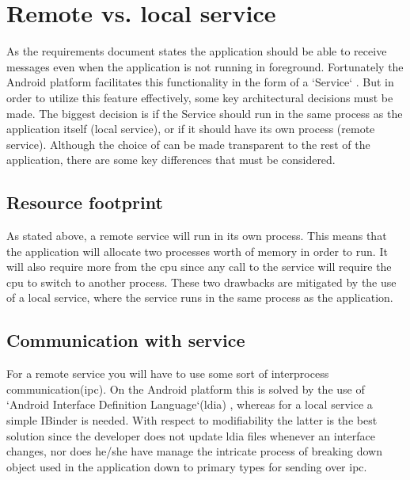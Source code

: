 

\section{Remote vs. local service}

As the requirements document states the application should be able to receive messages even when the application is not running in foreground. Fortunately the Android platform facilitates this functionality in the form of a `Service` \cite{bib:service}. But in order to utilize this feature effectively, some key architectural decisions must be made. The biggest decision is if the Service should run in the same process as the application itself (local service), or if it should have its own process (remote service). Although the choice of can be made transparent to the rest of the application, there are some key differences that must be considered.

\subsection{Resource footprint}
As stated above, a remote service will run in its own process. This means that the application will allocate two processes worth of memory in order to run. It will also require more from the \gls{cpu} since any call to the service will require the \gls{cpu} to switch to another process. These two drawbacks are mitigated by the use of a local service, where the service runs in the same process as the application. 

\subsection{Communication with service}
For a remote service you will have to use some sort of  interprocess communication(\gls{ipc}). On the Android platform this is solved by the use of `Android Interface Definition Language`(\gls{ldia}) \cite{bib:aidl}, whereas for a local service a simple IBinder \cite{bib:ibinder} is needed. With respect to modifiability the latter is the best solution since the developer does not update \gls{ldia} files whenever an interface changes, nor does he/she have manage the intricate process of breaking down object used in the application down to primary types for sending over \gls{ipc}.





